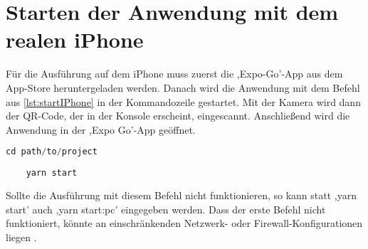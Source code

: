 \section{Starten der Anwendung mit dem realen iPhone}
Für die Ausführung auf dem iPhone muss zuerst die ,Expo-Go'-App aus dem App-Store heruntergeladen werden. Danach wird die Anwendung mit dem Befehl aus \autoref{lst:startIPhone} in der Kommandozeile gestartet. Mit der Kamera wird dann der QR-Code, der in der Konsole erscheint, eingescannt. Anschließend wird die Anwendung in der ,Expo Go'-App geöffnet.
\begin{lstlisting}[caption={Nachdem die ,Expo Go'-App im App-Store heruntergeladen wurde, kann mit der Ausführung dieser Befehle in der Kommandozeile die Anwendung gestartet werden. Anschließend wird der nun in der Konsole angezeigte QR-Code mit der iPhone-Kamera gescannt. Dann öffnet sich die Anwendung in der ,Expo Go'-App.},captionpos=b, language=Java, label=lst:startIPhone]
	cd path/to/project
	
	yarn start
\end{lstlisting}
Sollte die Ausführung mit diesem Befehl nicht funktionieren, so kann statt ,yarn start' auch ,yarn start:pc' eingegeben werden. Dass der erste Befehl nicht funktioniert, könnte an einschränkenden Netzwerk- oder Firewall-Konfigurationen liegen \cite{tunneling}.